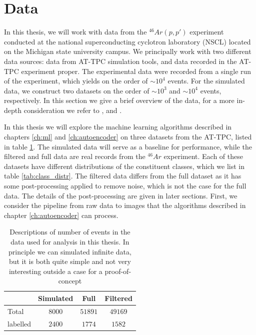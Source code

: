 \section{Data}\label{sec:data}

In this thesis, we will work with data from the ${}^{46}Ar(p, p')$ experiment conducted at the national superconducting cyclotron laboratory (NSCL) located on the Michigan state university campus. We principally work with two different data sources: data from AT-TPC simulation tools, and data recorded in the AT-TPC experiment proper. The experimental data were recorded from a single run of the experiment, which yields on the order of $\sim 10^4$ events.    For the simulated data, we construct two datasets on the order of $\sim10^3$ and $\sim10^4$ events, respectively. In this section we give a brief overview of the data, for a more in-depth consideration we refer to \cite{Mittig2015}, \cite{Suzuki2012} and  \cite{Bradt2017a}. 

In this thesis we will explore the machine learning algorithms described in chapters \ref{ch:ml} and \ref{ch:autoencoder} on three datasets from the AT-TPC, listed in table \ref{tab:datasets}. The simulated data will serve as a baseline for performance, while the filtered and full data are real records from the ${}^{46}Ar$ experiment. Each of these datasets have different distributions of the constituent classes, which we list in table \ref{tab:class_distr}. The filtered data differs from the full dataset as it has some post-processing applied to remove noise, which is not the case for the full data. The details of the post-processing are given in later sections. First, we consider the pipeline from raw data to images that the algorithms described in chapter \ref{ch:autoencoder} can process. 

\begin{table}
\centering
\caption{Descriptions of number of events in the data used for analysis in this thesis. In principle we can simulated infinite data, but it is both quite simple and not very interesting outside a case for a proof-of-concept}\label{tab:datasets}
\begin{tabular}{lccc}
\toprule
{} & Simulated & Full & Filtered \\
\midrule
Total &  $8000$ & $51891$ & $49169$ \\
labelled & $2400$ & $1774$ &  $1582$ \\ 
\bottomrule
\end{tabular}
\end{table}


